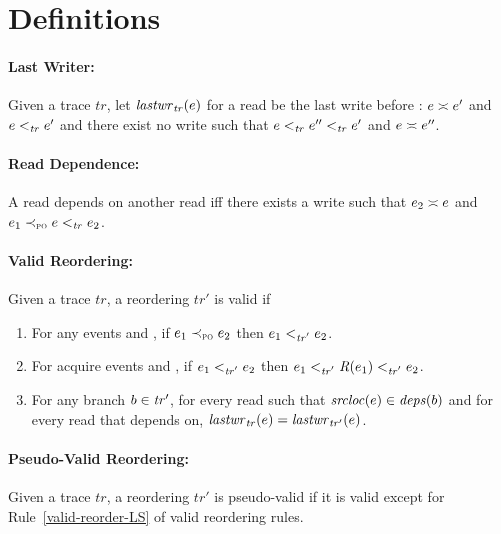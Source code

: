 \documentclass[letter,10pt]{article}
\newcommand{\lastwr}[2]{\ensuremath{\mathit{lastwr}_{#2}(#1)}\xspace}
\newcommand{\conflicts}[2]{\ensuremath{#1 \asymp #2}} %
\newcommand{\getRelease}[1]{\ensuremath{\mathit{R}(#1)}\xspace}
\newcommand{\getStatic}[1]{\ensuremath{\mathit{srcloc}(#1)}\xspace}
\newcommand{\getDeps}[1]{\ensuremath{\mathit{deps}(#1)}\xspace}
\newcommand{\tr}{\ensuremath{\mathit{tr}}\xspace}
\newcommand{\trPrime}{\ensuremath{\mathit{tr'}}\xspace}
\newcommand{\PO}{PO\xspace}
\newcommand{\ltTR}{\ensuremath{<_\textsc{\tr}}\xspace}
\newcommand{\ltTRPrime}{\ensuremath{<_\textsc{\trPrime}}\xspace}
\newcommand{\ltPO}{\ensuremath{\prec_\textsc{\tiny{\PO}}}\xspace}
\newcommand{\Ordered}[3]{\ensuremath{#1 #2 #3}}
\newcommand{\TROrdered}[2]{\Ordered{#1}{\ltTR}{#2}}
\newcommand{\TRPrimeOrdered}[2]{\Ordered{#1}{\ltTRPrime}{#2}}
\newcommand{\POOrdered}[2]{\Ordered{#1}{\ltPO}{#2}}
\newcommand\BrDepsOn[2]{\ensuremath{\getStatic{#2} \in \getDeps{#1}}}
\begin{document}
\section{Definitions}
\paragraph{Last Writer:} Given a trace \tr, let \lastwr{\event{e}{}}{\tr} for a read  be the
last write  before :
\conflicts{\event{e}{}}{\event{e}{'}} and \TROrdered{\event{e}{}}{\event{e}{'}}
and there exist no write  such that
\TROrdered{\event{e}{}}{\TROrdered{\event{e}{''}}{\event{e}{'}}} and
\conflicts{\event{e}{}}{\event{e}{''}}.

\paragraph{Read Dependence:} A read  depends on another read
 iff there exists a write  such that
\conflicts{\event{e}{_2}}{\event{e}} and
\POOrdered{\event{e}{_1}}{\TROrdered{\event{e}}{\event{e}{_2}}}.

\paragraph{Valid Reordering:} Given a trace \tr, a reordering \trPrime is valid if
\begin{enumerate}
\item For any events  and , if
  \POOrdered{\event{e}{_1}}{\event{e}{_2}} then
  \TRPrimeOrdered{\event{e}{_1}}{\event{e}{_2}}.\label{valid-reorder-PO}
\item For acquire events  and , if
  \TRPrimeOrdered{\event{e}{_1}}{\event{e}{_2}} then
  \TRPrimeOrdered{\event{e}{_1}}{\TRPrimeOrdered{\getRelease{\event{e}{_1}}}{\event{e}{_2}}}. \label{valid-reorder-LS}
\item For any branch $\event{b}{} \in \trPrime$, for every read  such
  that \BrDepsOn{\event{b}{}}{\event{e}{}} and for every read that
   depends on, $\lastwr{\event{e}{}}{\tr} = \lastwr{\event{e}{}}{\trPrime}$.\label{valid-reorder-CA}
\end{enumerate}

\paragraph{Pseudo-Valid Reordering:} Given a trace \tr, a reordering \trPrime is
pseudo-valid if it is valid except for Rule~\ref{valid-reorder-LS} of valid reordering rules.
\end{document}
